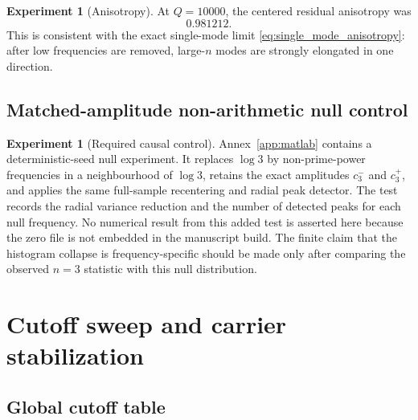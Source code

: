 \documentclass[11pt]{amsart}
\numberwithin{equation}{section}
\theoremstyle{plain}
\theoremstyle{definition}
\newtheorem{experiment}[theorem]{Experiment}
\theoremstyle{remark}
\newcommand{\1}{\mathbf{1}}
\begin{document}
\begin{experiment}[Anisotropy]
\label{exp:numerical_anisotropy}
At $Q=10000$, the centered residual anisotropy was
\begin{equation}
0.981212.
\label{eq:numerical_anisotropy_value}
\end{equation}
This is consistent with the exact single-mode limit
\eqref{eq:single_mode_anisotropy}: after low frequencies are removed,
large-$n$ modes are strongly elongated in one direction.
\end{experiment}


\subsection{Matched-amplitude non-arithmetic null control}
\label{subsec:n3_null_control}

\begin{experiment}[Required causal control]
\label{exp:n3_matched_null_control}
Annex~\ref{app:matlab} contains a deterministic-seed null experiment.  It
replaces $\log3$ by non-prime-power frequencies in a neighbourhood of
$\log3$, retains the exact amplitudes $c_3^-$ and $c_3^+$, and applies the
same full-sample recentering and radial peak detector.  The test records the radial
variance reduction and the number of detected peaks for each null frequency.
No numerical result from this added test is asserted here because the zero
file is not embedded in the manuscript build.  The finite claim that the
histogram collapse is frequency-specific should be made only after comparing
the observed $n=3$ statistic with this null distribution.
\end{experiment}

\section{Cutoff sweep and carrier stabilization}
\label{sec:numerical_cutoff_sweep}

\subsection{Global cutoff table}
\label{subsec:numerical_global_cutoff_table}
\end{document}
